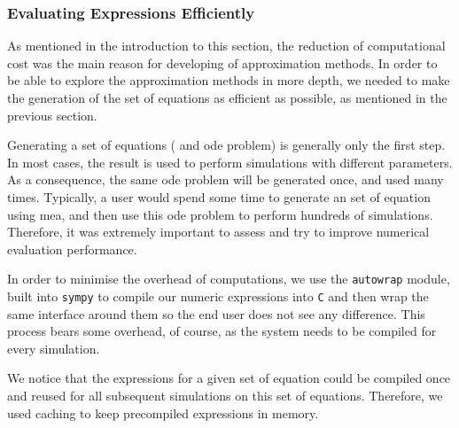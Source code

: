 \subsubsection{Evaluating Expressions Efficiently}
\label{sec:evaluating_expressions_efficiently}

As mentioned in the introduction to this section, the reduction of computational cost was the main reason for developing of approximation methods.
In order to be able to explore the approximation methods in more depth,
we needed to make the generation of the set of equations as efficient as possible, as mentioned in the previous section.

Generating a set of equations (\ie{} and \gls{ode} problem) is generally only the first step.
In most cases, the result is used to perform simulations with different parameters.
As a consequence, the same \gls{ode} problem will be generated once, and used many times.
Typically, a user would spend some time to generate an set of equation using \gls{mea}, and then use this \gls{ode} problem to perform hundreds of simulations.
Therefore, it was extremely important to assess and try to improve numerical evaluation performance.
 


In order to minimise the overhead of computations, we use the {\tt autowrap} module, built into {\tt sympy} to compile our numeric expressions into \texttt{C}
and then wrap the same \py{} interface around them so the end user does not see any difference.
This process bears some overhead, of course, as the system needs to be compiled for every simulation.

We notice that the expressions for a given set of equation could be compiled once and reused for all subsequent simulations on this set of equations.
Therefore, we used caching to keep precompiled expressions in memory.
 
